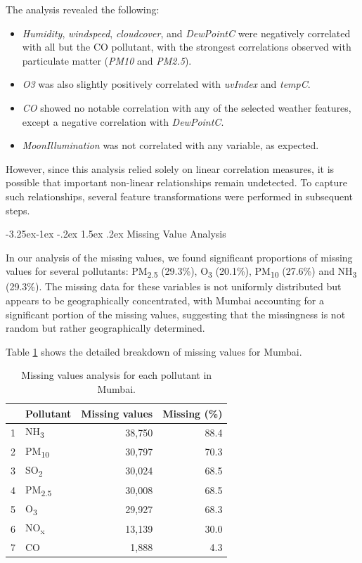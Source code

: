 \documentclass[twoside,11pt]{article}
\makeatletter
\renewcommand\subsubsection{\@startsection{subsubsection}{3}{\z@}%
  {-3.25ex\@plus -1ex \@minus -.2ex}%
  {1.5ex \@plus .2ex}%
  {\normalfont\bfseries\normalsize}}
\makeatother
\begin{document}
The analysis revealed the following:
\begin{itemize}
    \item \textit{Humidity}, \textit{windspeed}, \textit{cloudcover}, and \textit{DewPointC} were negatively correlated with all but the CO pollutant, with the strongest correlations observed with particulate matter (\textit{PM10} and \textit{PM2.5}).
    \item \textit{O3} was also slightly positively correlated with \textit{uvIndex} and \textit{tempC}.
    \item \textit{CO} showed no notable correlation with any of the selected weather features, except a negative correlation with \textit{DewPointC}.
    \item \textit{MoonIllumination} was not correlated with any variable, as expected.
\end{itemize}

However, since this analysis relied solely on linear correlation measures, it is possible that important non-linear relationships remain undetected. To capture such relationships, several feature transformations were performed in subsequent steps.

\subsubsection{Missing Value Analysis} \label{subsubsection:missing_data}

In our analysis of the missing values, we found significant proportions of missing values for several pollutants: PM\textsubscript{2.5} (29.3\%), O\textsubscript{3} (20.1\%), PM\textsubscript{10} (27.6\%) and NH\textsubscript{3} (29.3\%). The missing data for these variables is not uniformly distributed but appears to be geographically concentrated, with Mumbai accounting for a significant portion of the missing values, suggesting that the missingness is not random but rather geographically determined.

Table \ref{tab:missing_values} shows the detailed breakdown of missing values for Mumbai.

\begin{table}[ht]
\centering
\begin{tabular}{llrr}
\hline
& Pollutant & Missing values & Missing (\%) \\
\hline
1 & NH\textsubscript{3} & 38,750 & 88.4 \\
2 & PM\textsubscript{10} & 30,797 & 70.3 \\
3 & SO\textsubscript{2} & 30,024 & 68.5 \\
4 & PM\textsubscript{2.5} & 30,008 & 68.5 \\
5 & O\textsubscript{3} & 29,927 & 68.3 \\
6 & NO\textsubscript{x} & 13,139 & 30.0 \\
7 & CO & 1,888 & 4.3 \\
\hline
\end{tabular}
\caption{Missing values analysis for each pollutant in Mumbai.}
\label{tab:missing_values}
\end{table}
\end{document}

